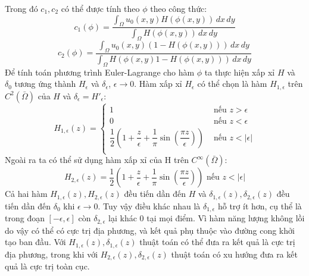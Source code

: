 \documentclass[12pt, oneside, a4paper]{book}
\begin{document}
Trong đó $c_1, c_2$ có thể được tính theo $\phi$ theo công thức:
\begin{equation*}
c_1(\phi)=\dfrac{\int_{\Omega}u_0(x,y)H(\phi(x,y))\,dx \,dy}{\int_{\Omega}H(\phi(x,y))\,dx\,dy}
\end{equation*}
\begin{equation*}
c_2(\phi)=\dfrac{\int_{\Omega}u_0(x,y)(1-H(\phi(x,y)))\,dx \,dy}{\int_{\Omega}H(\phi(x,y)1-H(\phi(x,y)))\,dx\,dy}
\end{equation*}
Để tính toán phương trình Euler-Lagrange cho hàm $\phi$ ta thực hiện xấp xỉ $H$ và $\delta_0$ tương ứng thành  $H_{\epsilon}$ và $\delta_{\epsilon}$, $\epsilon \rightarrow 0$. Hàm xấp xỉ $H_{\epsilon}$ có thể chọn là hàm $H_{1,{\epsilon}}$ trên $C^2(\bar{\Omega})$ của $H$ và $\delta_{\epsilon}=H'_{\epsilon}$:
\begin{equation*}
 H_{1,\epsilon}(z)=
\begin{cases}
 1 & \text{ nếu } z> \epsilon\\
0 & \text{ nếu } z <\epsilon \\
\dfrac{1}{2}(1+\dfrac{z}{\epsilon}+\dfrac{1}{\pi}\sin(\dfrac{\pi z}{\epsilon})) & \text{ nếu } z <|\epsilon|\\
   \end{cases}
\end{equation*}
Ngoài ra ta có thể sử dụng hàm xấp xỉ của H trên $C^{\infty}(\bar{\Omega})$:
\begin{equation*}
 H_{2,\epsilon}(z)=\dfrac{1}{2}(1+\dfrac{z}{\epsilon}+\dfrac{1}{\pi}\sin(\dfrac{\pi z}{\epsilon}))  \text{ nếu } z <|\epsilon|
\end{equation*}
Cả hai hàm $ H_{1,\epsilon}(z),  H_{2,\epsilon}(z)$ đều tiến dần đến $H$ và $ \delta_{1,\epsilon}(z),  \delta_{2,\epsilon}(z)$ đều tiến dần đến $\delta_0$ khi $\epsilon\rightarrow 0$. Tuy vậy điều khác nhau là $ \delta_{1,\epsilon}$ hỗ trợ ít hơn, cụ thể là trong đoạn $[-\epsilon, \epsilon]$ còn $ \delta_{2,\epsilon}$ lại khác 0 tại mọi điểm. Vì hàm năng lượng không lồi do vậy có thể có cực trị địa phương, và kết quả phụ thuộc vào đường cong khởi tạo ban đầu. Với $H_{1,\epsilon}(z), \delta_{1,\epsilon}(z)$ thuật toán có thể đưa ra kết quả là cực trị địa phương, trong khi với $H_{2,\epsilon}(z), \delta_{2,\epsilon}(z)$ thuật toán có xu hướng đưa ra kết quả là cực trị toàn cục.\\
\end{document}
